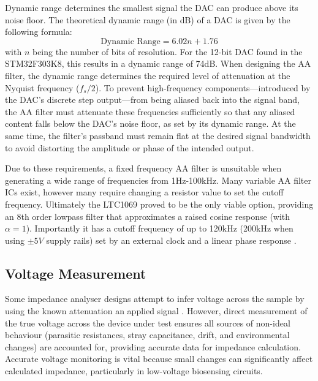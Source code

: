 Dynamic range determines the smallest signal the DAC can produce above its noise floor. The theoretical dynamic range (in dB) of a DAC is given by the following formula\cite{gaddyDYNAMICPERFORMANCETESTING}:
\begin{equation}
    \text{Dynamic Range}=6.02n + 1.76 
    \label{eq:dac_range}
\end{equation}
with $n$ being the number of bits of resolution. For the 12-bit \ac{DAC} found in the STM32F303K8, this results in a dynamic range of 74dB. When designing the AA filter, the dynamic range determines the required level of attenuation at the Nyquist frequency ($f_s/2$). To prevent high-frequency components—introduced by the DAC's discrete step output—from being aliased back into the signal band, the AA filter must attenuate these frequencies sufficiently so that any aliased content falls below the DAC's noise floor, as set by its dynamic range. At the same time, the filter's passband must remain flat at the desired signal bandwidth to avoid distorting the amplitude or phase of the intended output. 


Due to these requirements, a fixed frequency AA filter is unsuitable when generating a wide range of frequencies from 1Hz-100kHz. Many variable AA filter ICs exist, however many require changing a resistor value to set the cutoff frequency.  Ultimately the LTC1069 proved to be the only viable option, providing an 8th order lowpass filter that approximates a raised cosine response (with $\alpha=1$). Importantly it has a cutoff frequency of up to 120kHz (200kHz when using $\pm5V$ supply rails) set by an external clock and a linear phase response \cite{LTC10697CS8PBF}. 




\subsection{Voltage Measurement}
Some impedance analyser designs attempt to infer voltage across the sample by using the known attenuation an applied signal \cite{buscagliaSimpleZLowCostPortable2023}. However, direct measurement of the true voltage across the device under test ensures all sources of non-ideal behaviour (parasitic resistances, stray capacitance, drift, and environmental changes) are accounted for, providing accurate data for impedance calculation. Accurate voltage monitoring is vital because small changes can significantly affect calculated impedance, particularly in low-voltage biosensing circuits.

